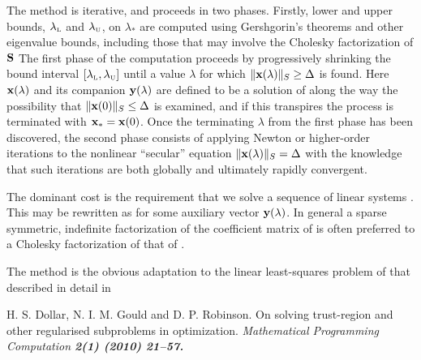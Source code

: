 \documentclass{galahad}
\begin{document}
\noindent
The method is iterative, and proceeds in two phases.
Firstly, lower and upper bounds, $\lambda_{\mbox{\protect\tiny L}}$ and
$\lambda_{\mbox{\protect\tiny U}}$, on $\lambda_*$ are computed
using Gershgorin's theorems and other eigenvalue bounds,
including those that may involve the Cholesky factorization of ${\mathbf{S}}$  The
first phase of the computation proceeds by progressively shrinking  the bound
interval $[\lambda_{\mbox{\protect\tiny L}},\lambda_{\mbox{\protect\tiny U}}]$
until a value $\lambda$ for which
$\|{\mathbf{x}}(\lambda)\|_S  \geq  \Delta$ is found.
Here ${\mathbf{x}}(\lambda)$ and its companion ${\mathbf{y}}(\lambda)$
are defined to be a solution of
along the way the possibility that
$\|{\mathbf{x}}(0)\|_S  \leq  \Delta$ is examined, and if this transpires
the process is terminated with ${\mathbf{x}}_* = {\mathbf{x}}(0)$.
Once the terminating $\lambda$ from the first phase has been discovered,
the second phase
consists of applying Newton or higher-order iterations to the nonlinear
``secular'' equation $\|{\mathbf{x}}(\lambda)\|_S  =  \Delta$ with
the knowledge that such iterations are both globally and ultimately
rapidly convergent.

The dominant cost is the requirement that we solve a sequence of linear systems
. This may be rewritten as
for some auxiliary vector ${\mathbf{y}}(\lambda)$.
In general a sparse symmetric, indefinite factorization of the
coefficient matrix of  is
often preferred to a Cholesky factorization of that of .

\galreference
The method is the obvious adaptation to the linear least-squares
problem of that described in detail in
\vspace*{1mm}

\noindent
H. S. Dollar, N. I. M. Gould and D. P. Robinson.
On solving trust-region and other regularised subproblems in optimization.
\em Mathematical Programming Computation \bf 2(1) \rm (2010) 21--57.

\end{document}
